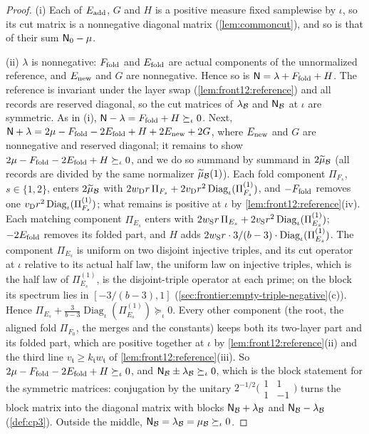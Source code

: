 \begin{proof}
(i) Each of $E_{\rm add}$, $G$ and $H$ is a positive measure fixed
samplewise by $\iota$, so its cut matrix is a nonnegative diagonal matrix
(\cref{lem:commoncut}), and so is that of their sum $\mathsf N_0-\mu$.

(ii) $\lambda$ is nonnegative: $F_{\rm fold}$ and $E_{\rm fold}$ are actual
components of the unnormalized reference, and $E_{\rm new}$ and $G$ are
nonnegative. Hence so is $\mathsf N=\lambda+F_{\rm fold}+H$. The reference is
invariant under the layer swap (\cref{lem:front12:reference}) and all records
are reserved diagonal, so the cut matrices of $\lambda_{\mathcal B}$ and
$\mathsf N_{\mathcal B}$ at $\iota$ are symmetric. As in (i),
$\mathsf N-\lambda=F_{\rm fold}+H\succeq_\iota0$. Next,
$\mathsf N+\lambda=2\mu-F_{\rm fold}-2E_{\rm fold}+H+2E_{\rm new}+2G$, where
$E_{\rm new}$ and $G$ are nonnegative and reserved diagonal; it remains to show
$2\mu-F_{\rm fold}-2E_{\rm fold}+H\succeq_\iota0$, and we do so summand by summand
in $2\widetilde\mu_{\mathcal B}$ (all records are divided by the same normalizer
$\widetilde\mu_{\mathcal B}(1)$). Each fold component $\Pi_{F_s}$, $s\in\{1,2\}$,
enters $2\widetilde\mu_{\mathcal B}$ with
$2w_{\rm D}r\,\Pi_{F_s}+2v_{\rm D}r^2\operatorname{Diag}_\iota(\Pi^{(1)}_{F_s})$,
and $-F_{\rm fold}$ removes one $v_{\rm D}r^2\operatorname{Diag}_\iota(\Pi^{(1)}_{F_s})$;
what remains is positive at $\iota$ by \cref{lem:front12:reference}(iv). Each
matching component $\Pi_{E_s}$ enters with
$2w_{\rm S}r\,\Pi_{E_s}+2v_{\rm S}r^2\operatorname{Diag}_\iota(\Pi^{(1)}_{E_s})$;
$-2E_{\rm fold}$ removes its folded part, and $H$ adds
$2w_{\rm S}r\cdot3/(b-3)\cdot\operatorname{Diag}_\iota(\Pi^{(1)}_{E_s})$. The
component $\Pi_{E_s}$ is uniform on two disjoint injective triples, and its
cut operator at $\iota$ relative to its actual half law, the uniform law on
injective triples, which is the half law of $\Pi^{(1)}_{E_s}$, is the
disjoint-triple operator at each prime; on the block its spectrum lies in
$[-3/(b-3),1]$ (\cref{sec:frontier:empty-triple-negative}(c)). Hence
$\Pi_{E_s}+\frac3{b-3}\operatorname{Diag}_\iota(\Pi^{(1)}_{E_s})\succeq_\iota0$.
Every other component (the root, the aligned fold $\Pi_{F_0}$, the merges and
the constants) keeps both its two-layer part and its folded part, which
are positive together at $\iota$ by \cref{lem:front12:reference}(ii) and the
third line $v_{\mathfrak t}\ge k_{\mathfrak t}w_{\mathfrak t}$ of
\cref{lem:front12:reference}(iii). So $2\mu-F_{\rm fold}-2E_{\rm fold}+H\succeq_\iota0$,
and $\mathsf N_{\mathcal B}\pm\lambda_{\mathcal B}\succeq_\iota0$, which is the block statement
for the symmetric matrices: conjugation by the unitary
$2^{-1/2}\bigl(\begin{smallmatrix}1&1\\1&-1\end{smallmatrix}\bigr)$ turns the
block matrix into the diagonal matrix with blocks $\mathsf N_{\mathcal B}+\lambda_{\mathcal B}$ and
$\mathsf N_{\mathcal B}-\lambda_{\mathcal B}$ (\cref{def:cp3}). Outside the middle,
$\mathsf N_{\mathcal B}=\lambda_{\mathcal B}=\mu_{\mathcal B}\succeq_\iota0$.
\end{proof}

